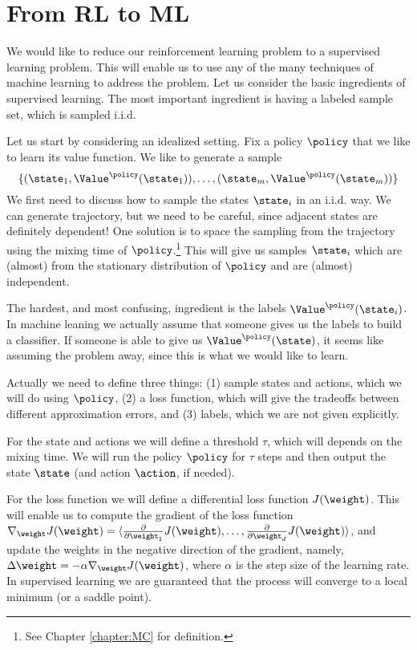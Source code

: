 \section{From RL to ML}

We would like to reduce our reinforcement learning problem to a
supervised learning problem. This will enable us to use any of the
many techniques of machine learning to address the problem. Let us
consider the basic ingredients of supervised learning. The most
important ingredient is having a labeled sample set, which is
sampled i.i.d.

Let us start by considering an idealized setting. Fix a policy
$\policy$ that we like to learn its value function. We like to
generate a sample
\[
\{(\state_1, \Value^\policy(\state_1)),\ldots,
(\state_m,\Value^\policy(\state_m))\}
\]
We first need to discuss how to sample the states $\state_i$ in an
i.i.d. way. We can generate trajectory, but we need to be careful,
since adjacent states are definitely dependent! One solution is to
space the sampling from the trajectory using the mixing time of
$\policy$.\footnote{See Chapter \ref{chapter:MC} for definition.}
This will give us samples $\state_i$ which are (almost) from the
stationary distribution of $\policy$ and are (almost) independent.

The hardest, and most confusing, ingredient is the labels
$\Value^\policy(\state_i)$. In machine leaning we actually assume
that someone gives us the labels to build a classifier.
If someone is able to give us
$\Value^\policy(\state)$, it seems like assuming the problem away,
since this is what we would like to learn.

Actually we need to define three things: (1) sample states and actions,
which we will do using $\policy$, (2) a loss function, which will
give the tradeoffs between different approximation errors, and (3)
labels, which we are not given explicitly.

For the state and actions we will define a threshold $\tau$, which
will depends on the mixing time. We will run the policy $\policy$
for $\tau$ steps and then output the state $\state$ (and action
$\action$, if needed).

For the loss function we will define a differential loss function
$J(\weight)$. This will enable us to compute the gradient of the
loss function $\nabla_\weight
J(\weight)=\langle\frac{\partial}{\partial \weight_1}J(\weight),
\ldots , \frac{\partial}{\partial \weight_d}J(\weight)\rangle$, and
update the weights in the negative direction of the gradient,
namely, $\Delta \weight=-\alpha\nabla_\weight J(\weight)$, where
$\alpha$ is the step size of the learning rate. In supervised
learning we are guaranteed that the process will converge to a local
minimum (or a saddle point).

